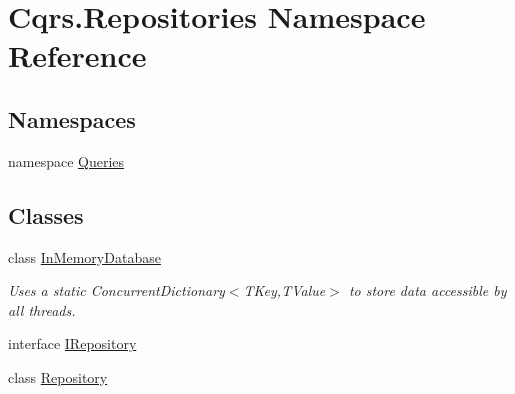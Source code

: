 \hypertarget{namespaceCqrs_1_1Repositories}{}\section{Cqrs.\+Repositories Namespace Reference}
\label{namespaceCqrs_1_1Repositories}
\subsection*{Namespaces}
\begin{DoxyCompactItemize}
\item 
namespace \hyperlink{namespaceCqrs_1_1Repositories_1_1Queries}{Queries}
\end{DoxyCompactItemize}
\subsection*{Classes}
\begin{DoxyCompactItemize}
\item 
class \hyperlink{classCqrs_1_1Repositories_1_1InMemoryDatabase}{In\+Memory\+Database}
\begin{DoxyCompactList}\small\item\em Uses a static Concurrent\+Dictionary$<$\+T\+Key,\+T\+Value$>$ to store data accessible by all threads. \end{DoxyCompactList}\item 
interface \hyperlink{interfaceCqrs_1_1Repositories_1_1IRepository}{I\+Repository}
\item 
class \hyperlink{classCqrs_1_1Repositories_1_1Repository}{Repository}
\end{DoxyCompactItemize}

